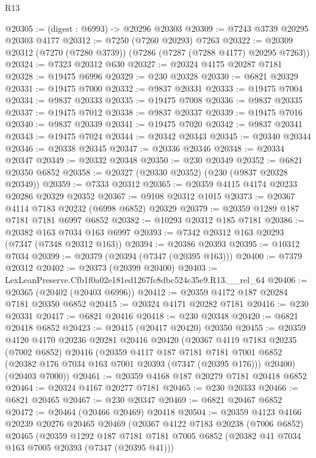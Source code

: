 \begin{lexlean}{R13}
\begin{coremodule}
@20305 := (digest : @6993) -> @20296 @20303
@20309 := @7243 @3739 @20295 @20303 @4177
@20312 := @7250 (@7260 @20293) @7263
@20322 := @20309 @20312 (@7270 (@7280 @3739)) (@7286 (@7287 (@7288 @4177) @20295 @7263))
@20324 := @7323 @20312 @630
@20327 := @20324 @4175 @20287 @7181
@20328 := @19475 @6996
@20329 := @230 @20328
@20330 := @6821 @20329
@20331 := @19475 @7000
@20332 := @9837 @20331
@20333 := @19475 @7004
@20334 := @9837 @20333
@20335 := @19475 @7008
@20336 := @9837 @20335
@20337 := @19475 @7012
@20338 := @9837 @20337
@20339 := @19475 @7016
@20340 := @9837 @20339
@20341 := @19475 @7020
@20342 := @9837 @20341
@20343 := @19475 @7024
@20344 := @20342 @20343
@20345 := @20340 @20344
@20346 := @20338 @20345
@20347 := @20336 @20346
@20348 := @20334 @20347
@20349 := @20332 @20348
@20350 := @230 @20349
@20352 := @6821 @20350 @6852
@20358 := @20327 (@20330 @20352) (@230 (@9837 @20328 @20349))
@20359 := @7333 @20312
@20365 := @20359 @4115 @4174 @20233 @20286 @20329 @20352
@20367 := @9108 @20312 @1015
@20373 := @20367 @4114 @7183 @20232 (@6998 @6852) @20329
@20379 := @20359 @1289 @187 @7181 @7181 @6997 @6852
@20382 := @10293 @20312 @185 @7181
@20386 := @20382 @163 @7034 @163 @6997
@20393 := @7342 @20312 @163 @20293 (@7347 (@7348 @20312 @163))
@20394 := @20386 @20393
@20395 := @10312 @7034
@20399 := @20379 (@20394 (@7347 (@20395 @163)))
@20400 := @7379 @20312
@20402 := @20373 (@20399 @20400)
@20403 := LexLeanPreserve.Cfb1f0a02e181ed1267fc8dbc524c35e9.R13.__rel_64
@20406 := @20365 (@20402 (@20403 @6996))
@20412 := @20359 @4172 @187 @20284 @7181 @20350 @6852
@20415 := @20324 @4171 @20282 @7181
@20416 := @230 @20331
@20417 := @6821 @20416
@20418 := @230 @20348
@20420 := @6821 @20418 @6852
@20423 := @20415 (@20417 @20420) @20350
@20455 := @20359
    @4120
    @4170
    @20236
    @20281
    @20416
    @20420
    (@20367
      @4119
      @7183
      @20235
      (@7002 @6852)
      @20416
      (@20359
        @4117
        @187
        @7181
        @7181
        @7001
        @6852
        (@20382 @176 @7034 @163 @7001 @20393 (@7347 (@20395 @176)))
        @20400)
      (@20403 @7000))
@20461 := @20359 @4168 @187 @20279 @7181 @20418 @6852
@20464 := @20324 @4167 @20277 @7181
@20465 := @230 @20333
@20466 := @6821 @20465
@20467 := @230 @20347
@20469 := @6821 @20467 @6852
@20472 := @20464 (@20466 @20469) @20418
@20504 := @20359
    @4123
    @4166
    @20239
    @20276
    @20465
    @20469
    (@20367
      @4122
      @7183
      @20238
      (@7006 @6852)
      @20465
      (@20359
        @1292
        @187
        @7181
        @7181
        @7005
        @6852
        (@20382 @41 @7034 @163 @7005 @20393 (@7347 (@20395 @41)))

\end{coremodule}
\end{lexlean}
